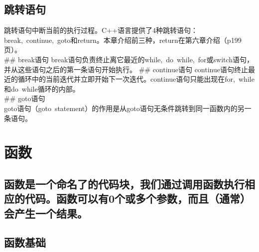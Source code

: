 \documentclass[
  a4paper,
  oneside,tablecaptionabove
]{scrbook}
\begin{document}
\section{跳转语句}\label{ux8df3ux8f6cux8bedux53e5}

跳转语句中断当前的执行过程。C++语言提供了4种跳转语句：break,~continue,~goto和return。本章介绍前三种，return在第六章介绍（p199页）。\\
\#\# break语句
break语句负责终止离它最近的while,~do~while,~for或switch语句，并从这些语句之后的第一条语句开始执行。
\#\# continue语句
continue语句终止最近的循环中的当前迭代并立即开始下一次迭代。continue语句只能出现在for,~while和do~while循环的内部。\\
\#\# goto语句\\
goto语句（goto~statement）的作用是从goto语句无条件跳转到同一函数内的另一条语句。

\chapter{函数}\label{ux51fdux6570}

\section{函数是一个命名了的代码块，我们通过调用函数执行相应的代码。函数可以有0个或多个参数，而且（通常）会产生一个结果。}\label{ux51fdux6570ux662fux4e00ux4e2aux547dux540dux4e86ux7684ux4ee3ux7801ux5757ux6211ux4eecux901aux8fc7ux8c03ux7528ux51fdux6570ux6267ux884cux76f8ux5e94ux7684ux4ee3ux7801ux51fdux6570ux53efux4ee5ux67090ux4e2aux6216ux591aux4e2aux53c2ux6570ux800cux4e14ux901aux5e38ux4f1aux4ea7ux751fux4e00ux4e2aux7ed3ux679c}

\section{函数基础}\label{ux51fdux6570ux57faux7840}
\end{document}
